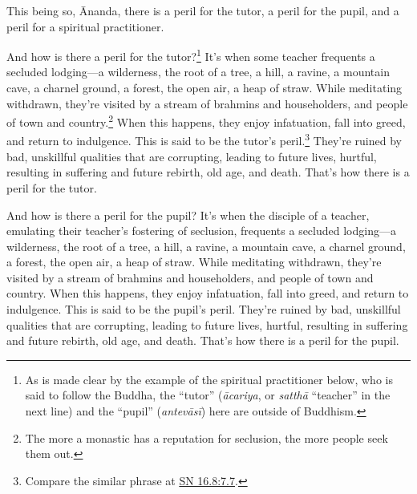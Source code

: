 \documentclass[12pt,openany]{book}%
\begin{document}
This being so, Ānanda, there is a peril for the tutor, a peril for the pupil, and a peril for a spiritual practitioner. 

And how is there a peril for the tutor?\footnote{As is made clear by the example of the spiritual practitioner below, who is said to follow the Buddha, the “tutor” (\textit{\textsanskrit{ācariya}}, or \textit{\textsanskrit{satthā}} “teacher” in the next line) and the “pupil” (\textit{\textsanskrit{antevāsī}}) here are outside of  Buddhism. } It’s when some teacher frequents a secluded lodging—a wilderness, the root of a tree, a hill, a ravine, a mountain cave, a charnel ground, a forest, the open air, a heap of straw. While meditating withdrawn, they’re visited by a stream of brahmins and householders, and people of town and country.\footnote{The more a monastic has a reputation for seclusion, the more people seek them out. } When this happens, they enjoy infatuation, fall into greed, and return to indulgence. This is said to be the tutor’s peril.\footnote{Compare the similar phrase at \href{https://suttacentral.net/sn16.8/en/sujato\#7.7}{SN 16.8:7.7}. } They’re ruined by bad, unskillful qualities that are corrupting, leading to future lives, hurtful, resulting in suffering and future rebirth, old age, and death. That’s how there is a peril for the tutor. 

And how is there a peril for the pupil? It’s when the disciple of a teacher, emulating their teacher’s fostering of seclusion, frequents a secluded lodging—a wilderness, the root of a tree, a hill, a ravine, a mountain cave, a charnel ground, a forest, the open air, a heap of straw. While meditating withdrawn, they’re visited by a stream of brahmins and householders, and people of town and country. When this happens, they enjoy infatuation, fall into greed, and return to indulgence. This is said to be the pupil’s peril. They’re ruined by bad, unskillful qualities that are corrupting, leading to future lives, hurtful, resulting in suffering and future rebirth, old age, and death. That’s how there is a peril for the pupil. 
\end{document}
